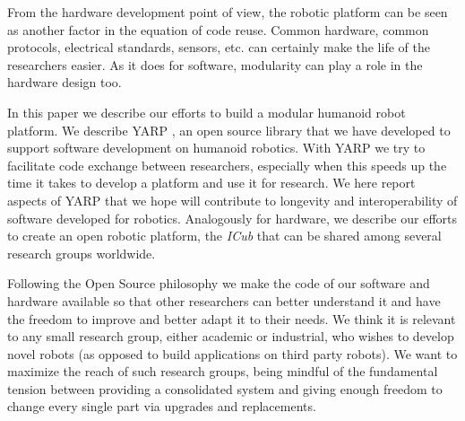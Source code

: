 %
From the hardware development point of view, the robotic platform can 
be seen as another factor in the
equation of code reuse. Common hardware, common protocols,
electrical standards, sensors, etc. can certainly make the 
life of the researchers easier. As it does for software, modularity 
can play a role in the hardware design too. 

In this paper we describe our efforts to build a modular
humanoid robot platform. We 
describe YARP \cite{metta2006yarp}, an open source library 
that we have developed to support software development on humanoid 
robotics. With YARP we try to facilitate code exchange between researchers, 
especially when this speeds up the time 
it takes to develop a platform and use it for research. We here report 
aspects of YARP that we hope will contribute to longevity and 
interoperability of software developed for robotics. Analogously for
hardware, we describe our efforts to create an open 
robotic platform, the \emph{ICub} that can be shared among several research 
groups worldwide.

Following the Open Source philosophy we make the 
code of our software and hardware available so that other 
researchers can better understand it and have the freedom 
to improve and better adapt it to their needs.
%
%
%
We think it is relevant to any small research group, either academic or
industrial, who wishes to develop novel robots (as opposed to 
build applications on third party robots).  We want to maximize the 
reach of such research groups, being mindful of the fundamental tension 
between providing a consolidated system and giving enough freedom
to change every single part via upgrades and replacements. 
%




